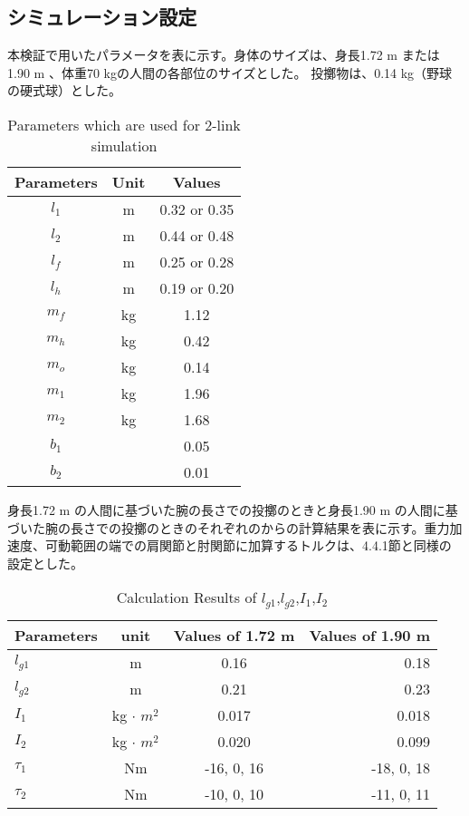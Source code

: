 \subsection{シミュレーション設定}
本検証で用いたパラメータを表に示す。身体のサイズは、身長1.72 m または 1.90 m 、体重70 kgの人間の各部位のサイズとした。
投擲物は、0.14 kg（野球の硬式球）とした。
\begin{table}[tb]
  \begin{center}
    \caption{Parameters which are used for 2-link simulation}
    \begin{tabular}{c|c|c}
      \hline
      Parameters & Unit & Values \\
      \hline
      $l_{1}$ & m & 0.32 or 0.35 \\
      $l_{2}$ & m & 0.44 or 0.48 \\
      $l_{f}$ & m & 0.25 or 0.28 \\
      $l_{h}$ & m & 0.19 or 0.20 \\
      $m_{f}$ & kg & 1.12 \\
      $m_{h}$ & kg & 0.42 \\
      $m_{o}$ & kg & 0.14 \\
      $m_{1}$ & kg & 1.96 \\
      $m_{2}$ & kg & 1.68 \\
      $b_{1}$ &  & 0.05 \\
      $b_{2}$ &  & 0.01 \\
      \hline
    \end{tabular}
  \end{center}
\end{table}


身長1.72 m の人間に基づいた腕の長さでの投擲のときと身長1.90 m の人間に基づいた腕の長さでの投擲のときのそれぞれのからの計算結果を表に示す。重力加速度、可動範囲の端での肩関節と肘関節に加算するトルクは、4.4.1節と同様の設定とした。
\begin{table}[tb]
  \begin{center}
    \caption{Calculation Results of $l_{g1}$,$l_{g2}$,$I_{1}$,$I_{2}$}
    \begin{tabular}{l|c|c|r}
      \hline
      Parameters & unit & Values of 1.72 m & Values of 1.90 m \\
      \hline
      $l_{g1}$ & m & 0.16 & 0.18 \\
      $l_{g2}$ & m & 0.21 & 0.23 \\
      $I_{1}$ & kg $\cdot$ ${m}^2$ & 0.017 & 0.018 \\
      $I_{2}$ & kg $\cdot$ ${m}^2$ & 0.020 & 0.099 \\
      $\tau_{1}$ & Nm & -16, 0, 16 & -18, 0, 18 \\
      $\tau_{2}$ & Nm & -10, 0, 10 & -11, 0, 11 \\
      \hline
    \end{tabular}
  \end{center}
\end{table}

